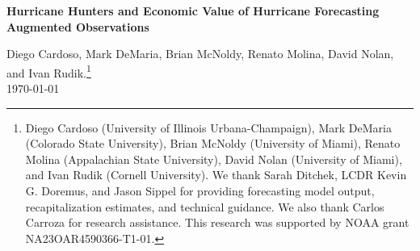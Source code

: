 \documentclass[12pt]{article}%
\begin{document}
\setlength{\floatsep}{24pt plus 4pt minus 2pt}
\setlength{\textfloatsep}{24pt plus 4pt minus 2pt}


\begin{titlepage}
\vspace*{.25cm}
\begin{center}
\renewcommand{\thefootnote}{\fnsymbol{footnote}}

{\noindent\LARGE\bfseries Hurricane Hunters and Economic Value of Hurricane Forecasting Augmented Observations\par}

\vspace{.7cm}
{\Large Diego Cardoso, Mark DeMaria, Brian McNoldy, Renato Molina, David Nolan, and Ivan Rudik.\footnote{Diego Cardoso (University of Illinois Urbana-Champaign), Mark DeMaria (Colorado State University), Brian McNoldy (University of Miami), Renato Molina (Appalachian State University), David Nolan (University of Miami), and Ivan Rudik (Cornell University). We thank Sarah Ditchek, LCDR Kevin G. Doremus, and Jason Sippel for providing forecasting model output, recapitalization estimates, and technical guidance. We also thank Carlos Carroza for research assistance. This research was supported by NOAA grant NA23OAR4590366-T1-01.}} \\

\vspace{.25cm}
{\Large\today}\\
\vspace{.25cm}
\end{center}

\begin{abstract}
\begin{normalsize}
\begin{singlespace}
What are the socioeconomic returns of flying airplanes into hurricanes? We study this question by linking forecasting experiments for ten US hurricane landfalls (2017–2020) to a structural model of hurricane costs, isolating the economic returns of in-situ reconnaissance. We find that observations facilitated by aircraft reconnaissance missions significantly reduce average forecast uncertainty 3 days before land fall for counties affected by hurricane-force winds. Implementing this improvement into a valuation framework, we estimate that this precision gain generates over \$36 million in social value per affected county. Between 2017 and 2020,  these improvements generated over \$5 billion in social benefits across the United States.
\end{singlespace}
\end{normalsize}
\end{abstract}


\end{titlepage}
\end{document}
